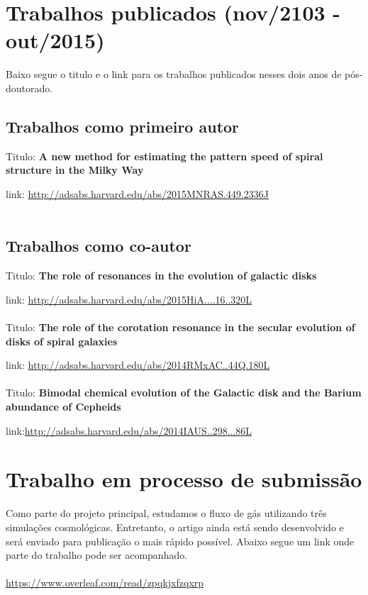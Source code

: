 \documentclass[a4paper, 12pt]{article}
\begin{document}
\section{Trabalhos publicados (nov/2103 - out/2015)}
\label{tp}

Baixo segue o titulo e o link para os trabalhos publicados nesses dois anos de pós-doutorado. 

\subsection{Trabalhos como primeiro autor}
\label{tp1}

Titulo:  {\bf A new method for estimating the pattern speed of spiral structure in the Milky Way}

link: \url{http://adsabs.harvard.edu/abs/2015MNRAS.449.2336J}
\\
\\
\subsection{Trabalhos como co-autor}

Titulo: {\bf The role of resonances in the evolution of galactic disks}

link: \url{http://adsabs.harvard.edu/abs/2015HiA....16..320L}
\\
\\
Titulo: {\bf The role of the corotation resonance in the secular evolution of disks of spiral galaxies}

link: \url{http://adsabs.harvard.edu/abs/2014RMxAC..44Q.180L}
\\
\\
Titulo: {\bf Bimodal chemical evolution of the Galactic disk and the Barium abundance of Cepheids}

link:\url{http://adsabs.harvard.edu/abs/2014IAUS..298...86L}

\section{Trabalho em processo de submissão}
\label{tps}
Como parte do projeto principal, estudamos o fluxo de gás utilizando três simulações cosmológicas. Entretanto, o artigo ainda está sendo desenvolvido e será enviado para publicação o mais rápido possível. Abaixo segue um link onde parte do trabalho pode ser acompanhado.
\\
\\
\url{https://www.overleaf.com/read/zpqkjxfzqxrp}
\end{document}
